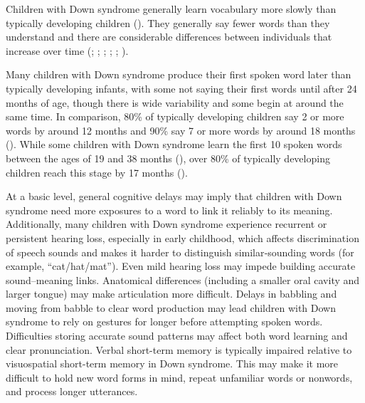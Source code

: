 \documentclass[
  11pt,
  a4paper,
]{report}
\begin{document}
Children with Down syndrome generally learn vocabulary more slowly than
typically developing children
(). They generally say fewer words than they understand and there
are considerable differences between individuals that increase over time
(; ;
;
;
; ).

Many children with Down syndrome produce their first spoken word later
than typically developing infants, with some not saying their first
words until after 24 months of age, though there is wide variability and
some begin at around the same time. In comparison, 80\% of typically
developing children say 2 or more words by around 12 months and 90\% say
7 or more words by around 18 months
().
While some children with Down syndrome learn the first 10 spoken words
between the ages of 19 and 38 months
(), over 80\% of typically developing children reach this stage by
17 months ().

At a basic level, general cognitive delays may imply that children with
Down syndrome need more exposures to a word to link it reliably to its
meaning. Additionally, many children with Down syndrome experience
recurrent or persistent hearing loss, especially in early childhood,
which affects discrimination of speech sounds and makes it harder to
distinguish similar‑sounding words (for example, ``cat/hat/mat''). Even
mild hearing loss may impede building accurate sound--meaning links.
Anatomical differences (including a smaller oral cavity and larger
tongue) may make articulation more difficult. Delays in babbling and
moving from babble to clear word production may lead children with Down
syndrome to rely on gestures for longer before attempting spoken words.
Difficulties storing accurate sound patterns may affect both word
learning and clear pronunciation. Verbal short-term memory is typically
impaired relative to visuospatial short-term memory in Down syndrome.
This may make it more difficult to hold new word forms in mind, repeat
unfamiliar words or nonwords, and process longer utterances.
\end{document}
